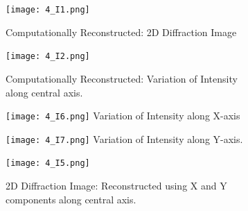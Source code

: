 \documentclass[12pt]{report}
\begin{document}
\newpage
\begin{figure}[h!]
	\centering
	\begin{subfigure}{0.45\textwidth}
		\texttt{[image: 4\_I1.png]}
		\begin{center} 
			Computationally Reconstructed: 2D Diffraction Image
		\end{center}
	\end{subfigure}
	\begin{subfigure}{0.45\textwidth}
		\texttt{[image: 4\_I2.png]}
		\begin{center}
			Computationally Reconstructed: Variation of Intensity along central axis.
		\end{center}
	\end{subfigure}
	\begin{subfigure}{0.45\textwidth}
		\texttt{[image: 4\_I6.png]}
		Variation of Intensity along X-axis
	\end{subfigure}
	\begin{subfigure}{0.45\textwidth}
		\texttt{[image: 4\_I7.png]}
		Variation of Intensity along Y-axis.
	\end{subfigure}
	\begin{subfigure}{0.5\textwidth}
		\texttt{[image: 4\_I5.png]}
		\begin{center} 
			2D Diffraction Image: Reconstructed using X and Y components along central axis. 
		\end{center}
	\end{subfigure}
\end{figure}

\newpage
\end{document}
